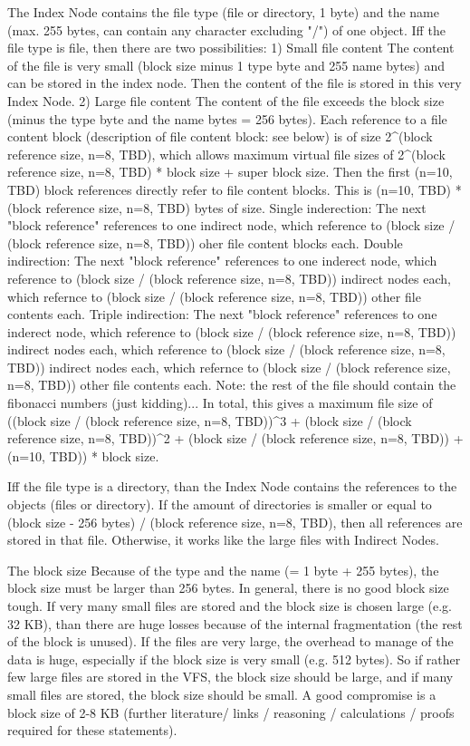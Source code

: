 \documentclass[a4paper,12pt]{article}
\begin{document}
{The Index Node contains the file type (file or directory, 1 byte) and the name (max. 255 bytes, can contain any character excluding "/") of one object.
Iff the file type is file, then there are two possibilities:
1) Small file content
The content of the file is very small (block size minus 1 type byte and 255 name bytes) and can be stored in the index node. Then the content of the file is stored in this very Index Node.
2) Large file content
The content of the file exceeds the block size (minus the type byte and the name bytes = 256 bytes).
Each reference to a file content block (description of file content block: see below) is of size 2^(block reference size, n=8, TBD), which allows maximum virtual file sizes of 2^(block reference size, n=8, TBD) * block size + super block size.
Then the first (n=10, TBD) block references directly refer to file content blocks. This is (n=10, TBD) * (block reference size, n=8, TBD) bytes of size.
Single inderection: The next "block reference" references to one indirect node, which reference to (block size / (block reference size, n=8, TBD)) oher file content blocks each.
Double indirection: The next "block reference" references to one inderect node, which reference to (block size / (block reference size, n=8, TBD)) indirect nodes each, which refernce to (block size / (block reference size, n=8, TBD)) other file contents each.
Triple indirection: The next "block reference" references to one inderect node, which reference to (block size / (block reference size, n=8, TBD)) indirect nodes each, which reference to (block size / (block reference size, n=8, TBD)) indirect nodes each, which refernce to (block size / (block reference size, n=8, TBD)) other file contents each.
Note: the rest of the file should contain the fibonacci numbers (just kidding)...
In total, this gives a maximum file size of ((block size / (block reference size, n=8, TBD))^3 + (block size / (block reference size, n=8, TBD))^2 + (block size / (block reference size, n=8, TBD)) + (n=10, TBD)) * block size.

Iff the file type is a directory, than the Index Node contains the references to the objects (files or directory). If the amount of directories is smaller or equal to (block size - 256 bytes) / (block reference size, n=8, TBD), 
then all references are stored in that file. Otherwise, it works like the large files with Indirect Nodes.

The block size
Because of the type and the name (= 1 byte + 255 bytes), the block size must be larger than 256 bytes. In general, there is no good block size tough. If very many small files are stored and the block size is chosen 
large (e.g. 32 KB), than there are huge losses because of the internal fragmentation (the rest of the block is unused). If the files are very large, the overhead to manage of the data is huge, especially if the
block size is very small (e.g. 512 bytes). So if rather few large files are stored in the VFS, the block size should be large, and if many small files are stored, the block size should be small. A good compromise is
a block size of 2-8 KB (further literature/ links / reasoning / calculations / proofs required for these statements).

}
\end{document}
